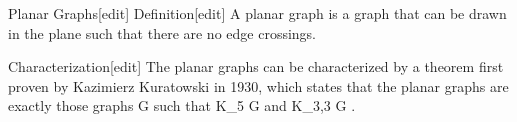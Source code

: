 Planar Graphs[edit]
Definition[edit]
A planar graph is a graph that can be drawn in the plane such that there are no edge crossings.

Characterization[edit]
The planar graphs can be characterized by a theorem first proven by Kazimierz Kuratowski in 1930, which states that the planar graphs are exactly those graphs G such that K_5 \not \preceq G  and K_{3,3} \not \preceq G .

